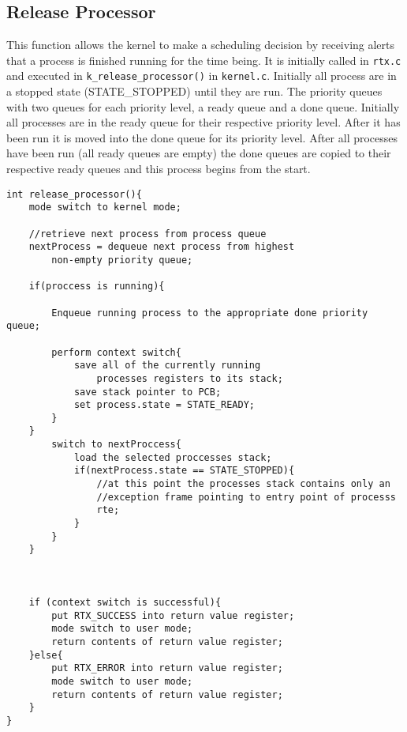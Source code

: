 \documentclass[oneside]{article}
\begin{document}
\subsection*{Release Processor}
This function allows the kernel to make a scheduling decision by receiving alerts that a process is finished running for the time being. It is initially called in \texttt{rtx.c} and executed in \texttt{k\_release\_processor()} in \texttt{kernel.c}. Initially all process are in a stopped state (STATE\_STOPPED) until they are run. The priority queues with two queues for each priority level, a ready queue and a done queue. Initially all processes are in the ready queue for their respective priority level. After it has been run it is moved into the done queue for its priority level. After all processes have been run (all ready queues are empty) the done queues are copied to their respective ready queues and this process begins from the start.
\begin{lstlisting}
int release_processor(){
    mode switch to kernel mode;

    //retrieve next process from process queue
    nextProcess = dequeue next process from highest 
        non-empty priority queue;
   
    if(proccess is running){

        Enqueue running process to the appropriate done priority queue;
     
        perform context switch{
            save all of the currently running 
                processes registers to its stack;
            save stack pointer to PCB;
            set process.state = STATE_READY;
        }
    }
        switch to nextProccess{
            load the selected proccesses stack;
            if(nextProcess.state == STATE_STOPPED){
                //at this point the processes stack contains only an 
                //exception frame pointing to entry point of processs                
                rte;            
            }
        }
    }
    
    

    if (context switch is successful){
        put RTX_SUCCESS into return value register;
        mode switch to user mode;
        return contents of return value register;
    }else{
        put RTX_ERROR into return value register;
        mode switch to user mode;
        return contents of return value register;
    }
}

\end{lstlisting}
\end{document}

